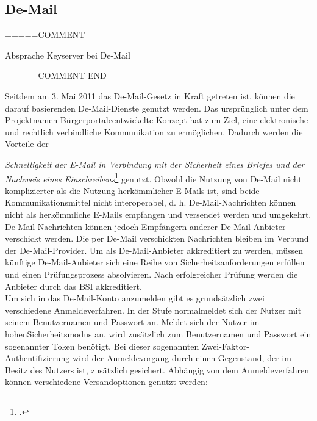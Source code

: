 \documentclass  [paper=a4,
				fontsize=12pt,
				listof=totoc,
				bibliography=totoc
				]{scrreprt}
\begin{document}
			\subsection{De-Mail}
			
			=====COMMENT
			
			Absprache Keyserver bei De-Mail
			
			=====COMMENT END
			
			Seitdem am 3. Mai 2011 das De-Mail-Gesetz in Kraft getreten ist, können die darauf basierenden De-Mail-Dienste genutzt werden.
			Das ursprünglich unter dem Projektnamen \glqq Bürgerportale\grqq entwickelte Konzept hat zum Ziel, eine elektronische und rechtlich verbindliche Kommunikation zu ermöglichen.
			Dadurch werden die Vorteile der {\textit{\glqq Schnelligkeit der E-Mail in Verbindung mit der Sicherheit eines Briefes und der Nachweis eines Einschreibens\grqq}\footcite[Vgl.][S. 8]{BSIDeMail} genutzt.
			Obwohl die Nutzung von De-Mail nicht komplizierter als die Nutzung herkömmlicher E-Mails ist, sind beide Kommunikationsmittel nicht interoperabel, d. h. De-Mail-Nachrichten können nicht als herkömmliche E-Mails empfangen und versendet werden und umgekehrt.
			De-Mail-Nachrichten können jedoch Empfängern anderer De-Mail-Anbieter verschickt werden.
			Die per De-Mail verschickten Nachrichten bleiben im Verbund der De-Mail-Provider.
			Um als De-Mail-Anbieter akkreditiert zu werden, müssen künftige De-Mail-Anbieter sich eine Reihe von Sicherheitsanforderungen erfüllen und einen Prüfungsprozess absolvieren.
			Nach erfolgreicher Prüfung werden die Anbieter durch das \ac{BSI} akkreditiert.\medskip\\
			
			Um sich in das De-Mail-Konto anzumelden gibt es grundsätzlich zwei verschiedene Anmeldeverfahren.
			In der Stufe \glqq normal\grqq meldet sich der Nutzer mit seinem Benutzernamen und Passwort an.
			Meldet sich der Nutzer im \glqq hohen\grqq Sicherheitsmodus an, wird zusätzlich zum Benutzernamen und Passwort ein sogenannter Token benötigt.
			Bei dieser sogenannten Zwei-Faktor-Authentifizierung wird der Anmeldevorgang durch einen Gegenstand, der im Besitz des Nutzers ist, zusätzlich gesichert.
			Abhängig von dem Anmeldeverfahren können verschiedene Versandoptionen genutzt werden:
			
}
\end{document}
